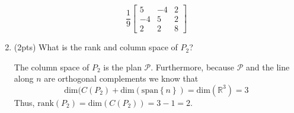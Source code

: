 \begin{enumerate}[label=(\alph*)]
\begin{mdframed}[style=MyFrame]
\begin{equation}
                        \frac{1}{9}
                        \begin{bmatrix}
                            5   &   -4  &   2   \\
                            -4  &   5   &   2   \\
                            2   &   2   &   8
                        \end{bmatrix}
            \end{equation}
        \end{mdframed}
    \item (2pts) What is the rank and column space of $P_{2}$?
        \begin{mdframed}[style=MyFrame]
            The column space of $P_{2}$ is the plan $\mathcal{P}$.
            Furthermore, because $\mathcal{P}$ and the line along $n$ are
            orthogonal complements we know that 
            \begin{equation}
                \text{dim}(C(P_{2}) +
                    \text{dim}\left(\text{span}\left\{ n \right\} \right) =
                    \text{dim}\left(\mathbb{R}^{3}\right) = 3
            \end{equation}
            Thus, $\text{rank}\left(P_{2}\right) = \text{dim}(C(P_{2}))
            = 3-1 =2$.
        \end{mdframed}


            
\end{enumerate}
